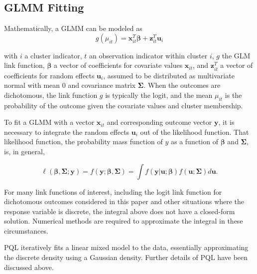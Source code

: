 \documentclass[Afour,times,sagev,doublespace]{sagej}
\begin{document}
\begin{sm}

\subsection{GLMM Fitting}
Mathematically, a GLMM can be modeled as
    \begin{equation}
        g(\mu_{it})=\mathbf{x}^T_{it} \boldsymbol{\beta} + \mathbf{z}^T_{it}\mathbf{u}_i
    \end{equation}
    
    with
 $i$ a cluster indicator, $t$ an observation indicator within cluster $i$, $g$ the GLM link function, $\boldsymbol{\beta}$ a vector of coefficients for covariate values $\mathbf{x}_{it}$, and $\mathbf{z}^T_{it}$ a vector of coefficients for random effects $\mathbf{u}_i$, assumed to be distributed as multivariate normal with mean $0$ and covariance matrix $\mathbf{\Sigma}$. When the outcomes are dichotomous, the link function $g$ is typically the logit, and the mean $\mu_{it}$ is the probability of the outcome given the covariate values and cluster membership.
 
To fit a GLMM with a vector $\mathbf{x}_{it}$ and corresponding outcome vector $\mathbf{y}$, it is necessary to integrate the random effects $\mathbf{u}_i$ out of the likelihood function\cite{rodriguez_assessment_1995}. That likelihood function, the probability mass function of $y$ as a function of $\boldsymbol{\beta}$ and $\mathbf{\Sigma}$\cite{agresti_categorical_2013}, is, in general,

\begin{equation}
 \ell(\boldsymbol{\beta}, \mathbf{\Sigma} ; \mathbf{y})=f(\mathbf{y};\boldsymbol{\beta}, \mathbf{\Sigma})=\int f(\mathbf{y}|\mathbf{u};\boldsymbol{\beta})f(\mathbf{u}; \mathbf{\Sigma})d\mathbf{u}.   
\end{equation}

For many link functions of interest, including the logit link function for dichotomous outcomes considered in this paper and other situations where the response variable is discrete, the integral above does not have a closed-form solution\cite{ng_estimation_2006}. Numerical methods are required to approximate the integral in these circumstances.

PQL iteratively fits a linear mixed model\cite{lin_bias_1996} to the data, essentially approximating the discrete density using a Gaussian density\cite{ng_estimation_2006}. Further details of PQL have been discussed above.


\end{sm}
\end{document}
